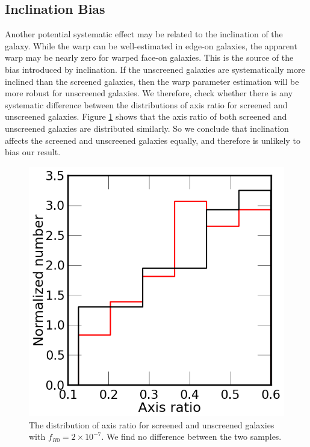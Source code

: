 \documentclass{emulateapj}
\begin{document}
\subsection{Inclination Bias}
\label{ap:inclination-systematic}
Another potential systematic
effect may be related to the inclination of the galaxy.
While the warp can be well-estimated in edge-on galaxies,
the apparent warp may be nearly zero for warped face-on galaxies. This is the
source of the bias introduced by inclination.  If the unscreened galaxies
are systematically more inclined than the screened galaxies, then the warp
parameter estimation will be more robust for unscreened galaxies. 
We therefore, check whether there is any systematic difference between the
distributions of axis ratio for screened and unscreened galaxies. Figure
\ref{warp-incl} shows that the axis ratio
of both screened and unscreened galaxies are distributed similarly. So we
conclude that inclination affects the screened and unscreened galaxies
equally, and therefore is unlikely to bias our result.

\begin{figure}
\begin{center}
  \includegraphics[scale=0.4]{figures/axis-ratio-dist.png}
\caption{The distribution of axis ratio for screened and
unscreened galaxies with $f_{R0}=2\times10^{-7}$. We find no difference  between
the two samples.}
\label{warp-incl}
\end{center}
\end{figure}
\end{document}
